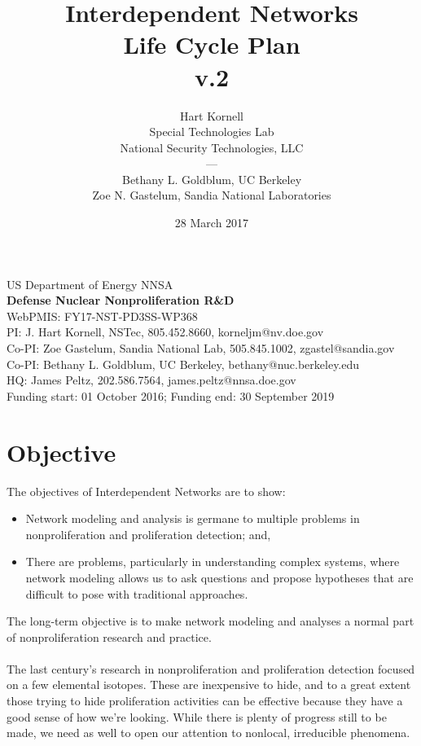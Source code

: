 \documentclass{article} %
\title{Interdependent Networks\\Life Cycle Plan\\v.2}
\author{Hart Kornell\\ Special Technologies Lab\\National Security Technologies, LLC\\
---\\
Bethany L. Goldblum, UC Berkeley\\
Zoe N. Gastelum, Sandia National Laboratories}
\date{28 March 2017}
\begin{document}
\maketitle

\vfill
\begin{center}
US Department of Energy NNSA \\
\textbf{Defense Nuclear Nonproliferation R\&D} \\
WebPMIS: FY17-NST-PD3SS-WP368  \\
PI: J. Hart Kornell, NSTec, 805.452.8660, korneljm@nv.doe.gov \\
Co-PI: Zoe Gastelum, Sandia National Lab, 505.845.1002, zgastel@sandia.gov \\
Co-PI: Bethany L. Goldblum, UC Berkeley, bethany@nuc.berkeley.edu \\
HQ: James Peltz, 202.586.7564, james.peltz@nnsa.doe.gov \\
Funding start: 01 October 2016; Funding end: 30 September 2019
\end{center}
\newpage
\thispagestyle{empty}
\mbox{}
\newpage

\newpage

\onehalfspace

\tableofcontents{}

\newpage
\thispagestyle{empty}
\mbox{}
\newpage

\section{Objective}
The objectives of Interdependent Networks are to show:
\renewcommand\labelitemi{\tiny$\bullet$}
\begin{itemize}
\item Network modeling and analysis is germane to multiple problems in nonproliferation and proliferation detection; and,
\item There are problems, particularly in understanding complex systems, where network modeling allows us to ask questions and propose hypotheses that are difficult to pose with traditional approaches.
\end{itemize}
The long-term objective is to make network modeling and analyses a normal part of nonproliferation research and practice.\\
\\
\noindent The last century's research in nonproliferation and proliferation detection focused on a few elemental isotopes. These are inexpensive to hide, and to a great extent those trying to hide proliferation activities can be effective because they have a good sense of how we're looking. While there is plenty of progress still to be made, we need as well to open our attention to nonlocal, irreducible phenomena. 
\end{document}
